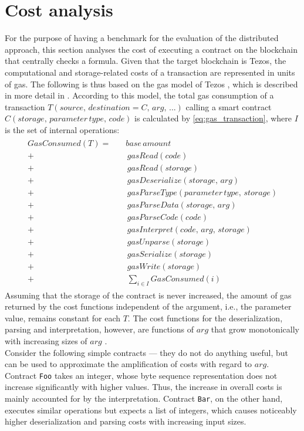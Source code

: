 \section{Cost analysis}\label{sec:usecase_cost}
For the purpose of having a benchmark for the evaluation of the distributed approach, this section analyses the cost of executing a contract on the blockchain that centrally checks a formula. Given that the target blockchain is Tezos, the computational and storage-related costs of a transaction are represented in units of gas. The following is thus based on the gas model of Tezos \cite{morley_gasmodel}\cite{tezos_repo}, which is described in more detail in . According to this model, the total gas consumption of a transaction $T(source,\, destination=C,\, arg, \, ...)$ calling a smart contract $C(storage, \, parameter\, type, \, code)$ is calculated by \eqref{eq:gas_transaction}, where $I$ is the set of internal operations:
\begin{align}\label{eq:gas_transaction}
\begin{split}
GasConsumed(T) = \quad &base \, amount \\
+& \, gasRead(code) \\
+& \, gasRead(storage) \\
+& \, gasDeserialize(storage, \, arg) \\
+& \, gasParseType(parameter \, type, \, storage) \\
+& \, gasParseData(storage, \, arg) \\
+& \, gasParseCode(code) \\
+& \, gasInterpret(code, \, arg, \, storage) \\
+& \, gasUnparse(storage) \\
+& \, gasSerialize(storage) \\
+& \, gasWrite(storage) \\
+& \, \sum_{i \in I} GasConsumed(i)
\end{split}
\end{align}
Assuming that the storage of the contract is never increased, the amount of gas returned by the cost functions independent of the argument, i.e., the parameter value, remains constant for each $T$. The cost functions for the deserialization, parsing and interpretation, however, are functions of $arg$ that grow monotonically with increasing sizes of $arg$ \cite{morley_gasmodel}\cite{tezos_repo}. \\
Consider the following simple contracts --- they do not do anything useful, but can be used to approximate the amplification of costs with regard to $arg$. Contract \texttt{Foo} takes an integer, whose byte sequence representation does not increase significantly with higher values. Thus, the increase in overall costs is mainly accounted for by the interpretation. Contract \texttt{Bar}, on the other hand, executes similar operations but expects a list of integers, which causes noticeably higher deserialization and parsing costs with increasing input sizes. 
